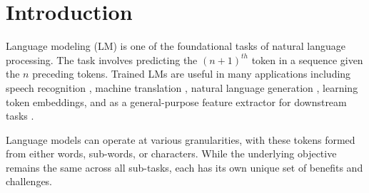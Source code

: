 \documentclass{article}
\newcommand{\enwik}{\texttt{enwik8}\xspace}
\begin{document}





\printAffiliationsAndNotice{\icmlEqualContribution} 

\begin{abstract}
Many of the leading approaches in language modeling introduce novel, complex and specialized architectures.
We take existing state-of-the-art word level language models based on LSTMs and QRNNs and extend them to both larger vocabularies as well as character-level granularity.
When properly tuned, LSTMs and QRNNs achieve state-of-the-art results on character-level (Penn Treebank, \enwik) and word-level (WikiText-103) datasets, respectively.
Results are obtained in only 12 hours (WikiText-103) to 2 days (\enwik) using a single modern GPU.
\end{abstract}

\section{Introduction}

Language modeling (LM) is one of the foundational tasks of natural language processing.
The task involves predicting the $(n+1)^{th}$ token in a sequence given the $n$ preceding tokens.
Trained LMs are useful in many applications including speech recognition \citep{yu2014automatic}, machine translation \citep{koehn2009statistical}, natural language generation \citep{radford2017learning, smerity-revisiting}, learning token embeddings, and as a general-purpose feature extractor for downstream tasks \cite{elmo}.

Language models can operate at various granularities, with these tokens formed from either words, sub-words, or characters.
While the underlying objective remains the same across all sub-tasks, each has its own unique set of benefits and challenges.
\end{document}
